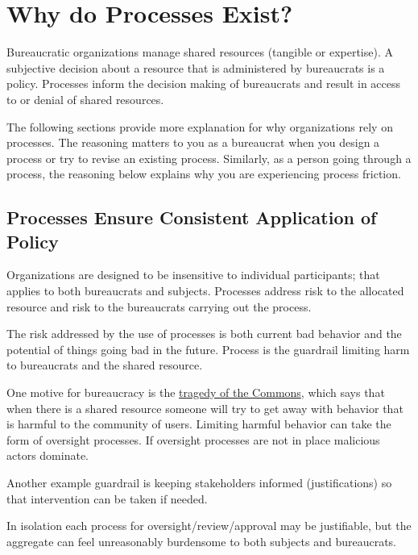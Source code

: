 \section{Why do Processes Exist?\label{sec:why-processes-exist}}

Bureaucratic organizations manage shared resources (tangible or expertise). 
A subjective decision about a resource that is  administered by bureaucrats is a \gls{policy}.
Processes inform the decision making of bureaucrats and result in access to or denial of shared resources. 

The following sections provide more explanation for why organizations rely on processes. The reasoning matters to you as a bureaucrat when you design a process or try to revise an existing process. Similarly, as a person going through a process, the reasoning below explains why you are experiencing \gls{process friction}. 

\subsection*{Processes Ensure Consistent Application of Policy}

Organizations are designed to be insensitive to individual participants; that applies to both bureaucrats and subjects. Processes address risk to the allocated resource and risk to the bureaucrats carrying out the process.

The risk addressed by the use of processes is both current bad behavior and the potential of things going bad in the future. Process is the guardrail limiting harm to bureaucrats and the shared resource. 

One motive for bureaucracy is the \href{https://en.wikipedia.org/wiki/Tragedy_of_the_commons}{tragedy of the Commons}, which says that when there is a shared resource someone will try to get away with behavior that is harmful to the community of users. Limiting harmful behavior can take the form of oversight processes. If oversight processes are not in place malicious actors dominate.

Another example guardrail is keeping stakeholders informed (justifications) so that intervention can be taken if needed. 


In isolation each process for oversight/review/approval may be justifiable, but the aggregate can feel unreasonably burdensome to both subjects and bureaucrats.





